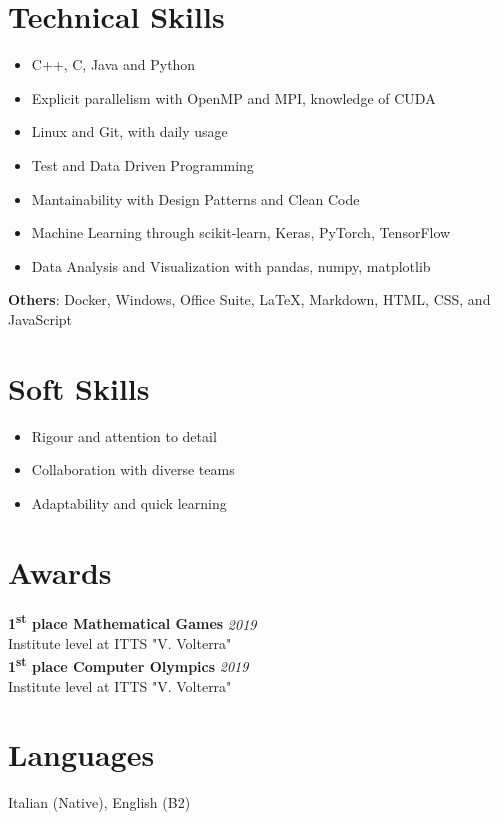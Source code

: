 \documentclass[a4paper,10pt]{article}
\begin{document}
\begin{minipage}[t]{0.33\textwidth}
    \section*{Technical Skills}
    \vspace{-0.1cm}
    \begin{itemize}[left=0.2cm, label={\textbullet}]
        \item C++, C, Java and Python %
        \item Explicit parallelism with OpenMP and MPI, knowledge of CUDA
        \item Linux and Git, with daily usage
        \item Test and Data Driven Programming
        \item Mantainability with Design Patterns and Clean Code
        \item Machine Learning through scikit-learn, Keras, PyTorch, TensorFlow
        \item Data Analysis and Visualization with pandas, numpy, matplotlib
    \end{itemize}
    \textbf{Others}: Docker, Windows, Office Suite, \LaTeX , Markdown, HTML, CSS, and JavaScript
    \section*{Soft Skills}
    \begin{itemize}[left=0.2cm, label={\textbullet}]
        \item Rigour and attention to detail
        \item Collaboration with diverse teams
        \item Adaptability and quick learning
    \end{itemize}

    \section*{Awards}
        \textbf{1\textsuperscript{st} place Mathematical Games} \hfill \textit{2019} \\ Institute level at ITTS "V. Volterra" \\

        \textbf{1\textsuperscript{st} place Computer Olympics} \hfill \textit{2019} \\ Institute level at ITTS "V. Volterra"

    \section*{Languages}
        Italian (Native), English (B2)


\end{minipage}
\end{document}
